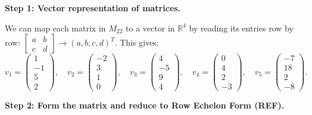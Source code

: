 \documentclass[12pt,a3paper]{article}
\begin{document}
\begin{tcolorbox}[enhanced,breakable,
  colback=cC!4,colframe=cC,boxrule=0.8pt,arc=5pt,
  title={\textbf{Answer --- Basis and Coordinates in $M_{22}$}},
  fonttitle=\bfseries\color{white},colbacktitle=cC]

\textbf{Step 1: Vector representation of matrices.}

We can map each matrix in $M_{22}$ to a vector in $\mathbb{R}^4$ by reading its entries row by row: $\begin{bmatrix} a & b \\ c & d \end{bmatrix} \to (a, b, c, d)^T$. This gives:
\[
v_1 = \begin{pmatrix} 1 \\ -1 \\ 5 \\ 2 \end{pmatrix}, \quad
v_2 = \begin{pmatrix} -2 \\ 3 \\ 1 \\ 0 \end{pmatrix}, \quad
v_3 = \begin{pmatrix} 4 \\ -5 \\ 9 \\ 4 \end{pmatrix}, \quad
v_4 = \begin{pmatrix} 0 \\ 4 \\ 2 \\ -3 \end{pmatrix}, \quad
v_5 = \begin{pmatrix} -7 \\ 18 \\ 2 \\ -8 \end{pmatrix}.
\]

\textbf{Step 2: Form the matrix and reduce to Row Echelon Form (REF).}


\end{tcolorbox}
\end{document}

